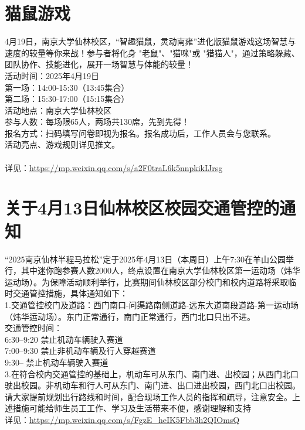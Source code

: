 \documentclass[letterpaper, 12pt]{article}
\begin{document}
\begin{multicols}{2}
\section{猫鼠游戏}
4月19日，南京大学仙林校区，“智趣猫鼠，灵动南雍”进化版猫鼠游戏这场智慧与速度的较量等你来战！参与者将化身 "老鼠"、"猫咪"或 "猎猫人"，通过策略躲藏、团队协作、技能进化，展开一场智慧与体能的较量！
\\活动时间：2025年4月19日
\\第一场：14:00-15:30（13:45集合）
\\第二场：15:30-17:00（15:15集合）
\\活动地点：南京大学仙林校区
\\参与人数：每场限65人，两场共130席，先到先得！
\\报名方式：扫码填写问卷即视为报名。报名成功后，工作人员会与您联系。
\\活动亮点、游戏规则详见推文。
\\
\\详见：\url{https://mp.weixin.qq.com/s/a2F0traL6k5nnpkikIJrsg}

\section{关于4月13日仙林校区校园交通管控的通知}
“2025南京仙林半程马拉松”定于2025年4月13日（本周日）上午7:30在羊山公园举行，其中迷你跑参赛人数2000人，终点设置在南京大学仙林校区第一运动场（炜华运动场）。为保障活动顺利举行，比赛期间仙林校区部分校门和校内道路将采取临时交通管控措施，具体通知如下：
\\1.交通管控校门及道路：西门南口-问渠路南侧道路-远东大道南段道路-第一运动场（炜华运动场）。东门正常通行，南门正常通行，西门北口只出不进。
\\交通管控时间：
\\6:30--9:20 禁止机动车辆驶入赛道
\\7:00--9:30 禁止非机动车辆及行人穿越赛道
\\9:30-- 禁止机动车辆驶入赛道
\\3.在符合校内交通管控的基础上，机动车可从东门、南门进、出校园；从西门北口驶出校园。非机动车和行人可从东门、南门进、出口进出校园，西门北口出校园。
\\请大家提前规划出行路线和时间，配合现场工作人员的指挥和疏导，注意安全。上述措施可能给师生员工工作、学习及生活带来不便，感谢理解和支持
\\详见：\url{https://mp.weixin.qq.com/s/FgzE_heIK5Fbb3h2QIOmsQ}

\end{multicols}
\end{document}

